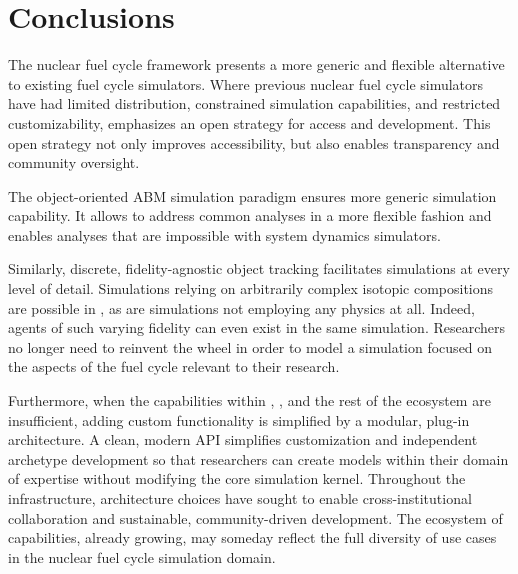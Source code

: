 

\section{Conclusions}


The \Cyclus nuclear fuel cycle framework presents a more generic and flexible
alternative to existing fuel cycle simulators. Where previous nuclear fuel
cycle simulators have had limited distribution, constrained simulation
capabilities, and restricted customizability, \Cyclus emphasizes an open
strategy for access and development.  This open strategy not only improves
accessibility, but also enables transparency and community oversight.

The object-oriented \gls{ABM} simulation paradigm ensures more generic
simulation capability. It allows \Cyclus to address common analyses in a more
flexible fashion and enables analyses that are impossible with system dynamics
simulators.

Similarly, discrete, fidelity-agnostic object tracking facilitates simulations
at every level of detail. Simulations relying on arbitrarily complex isotopic
compositions are possible in \Cyclus, as are simulations not employing any
physics at all. Indeed, agents of such varying fidelity can even exist in the
same simulation. Researchers no longer need to reinvent the wheel in order to
model a simulation focused on the aspects of the fuel cycle
relevant to their research.

Furthermore, when the capabilities within \Cyclus, \Cycamore, and the rest of
the ecosystem are insufficient, adding custom functionality is simplified by a
modular, plug-in architecture. A clean, modern \gls{API} simplifies
customization and independent archetype development so that researchers can
create models within their domain of expertise without modifying the core
simulation kernel. Throughout the \Cyclus
infrastructure, architecture choices have sought to enable cross-institutional
collaboration and sustainable, community-driven development. The ecosystem
of capabilities, already growing, may someday reflect the full diversity of use
cases in the nuclear fuel cycle simulation domain.


